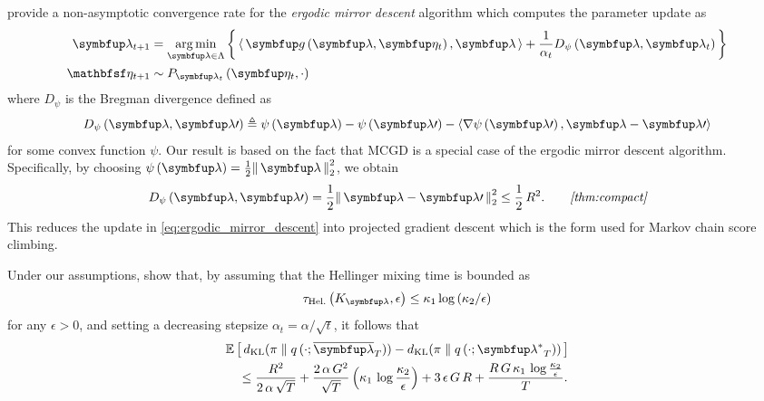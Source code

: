 \begin{proofEnd}
  \citet[Corollary 3.5]{duchi_ergodic_2012} provide a non-asymptotic convergence rate for the \textit{ergodic mirror descent} algorithm which computes the parameter update as
  \begin{align}
    \vlambda_{t+1} &= \argmin_{\vlambda \in \Lambda} \left\{\,
    \iprod{\,\vg\left(\vlambda, \veta_t\right)}{\vlambda\,} 
    +
    \frac{1}{\alpha_t} D_{\psi}\left(\vlambda, \vlambda_{t}\right)
    \,\right\}\label{eq:ergodic_mirror_descent}
    \\
    \rvveta_{t+1} &\sim P_{\vlambda_{t}}\left(\veta_t, \cdot\right)
    \nonumber
  \end{align}
  where \(D_{\psi}\) is the Bregman divergence defined as
  \begin{align*}
    D_{\psi}\left(\vlambda, \vlambda\prime\right)
    \triangleq
    \psi\left(\vlambda\right)
    - \psi\left(\vlambda\prime\right)
    - \iprod{ \nabla \psi\left(\vlambda\prime\right)}{\vlambda - \vlambda\prime}
  \end{align*}
  for some convex function \(\psi\).
  Our result is based on the fact that MCGD is a special case of the ergodic mirror descent algorithm.
  Specifically, by choosing \(\psi\left(\vlambda\right) = \frac{1}{2} \norm{\vlambda}^2_2 \), we obtain
  \begin{alignat}{2}
    D_{\psi}\left(\vlambda, \vlambda\prime\right) = \frac{1}{2} \norm{\vlambda - \vlambda\prime}_2^2 \leq \frac{1}{2} \, R^2.\label{eq:bregman}
    &&\quad\text{\textit{\cref{thm:compact}}}
  \end{alignat}
  This reduces the update in \cref{eq:ergodic_mirror_descent} into projected gradient descent which is the form used for Markov chain score climbing.

  Under our assumptions, \citet[Corollary 3.5]{duchi_ergodic_2012} show that, by assuming that the Hellinger mixing time is bounded as
  \begin{align}
    \tau_{\text{Hel.}}\left(K_{\vlambda}, \epsilon\right) \leq \kappa_1 \log\left( \kappa_2 /\epsilon \right) \label{eq:hellinger_mixing}
  \end{align}
  for any \(\epsilon > 0\), and setting a decreasing stepsize \(\alpha_t = \alpha / \sqrt{t}\),
  it follows that
  \begin{align}
    &\E{ \DKL{\pi}{q\,(\cdot; {\overline{\vlambda}_{T}})} - \DKL{\pi}{q\left(\cdot; {\vlambda^*}_{T}\right)}}
    \nonumber
    \\
    &\quad\leq
    \frac{R^2}{2 \, \alpha \, \sqrt{T}}
    +
    \frac{2 \, \alpha \, G^2}{\sqrt{T}}\left( \kappa_1 \, \log \frac{\kappa_2}{\epsilon} \right)
    +
    3 \, \epsilon \, G \, R
    +
    \frac{R \, G \, \kappa_1 \, \log \frac{\kappa_2}{\epsilon}}{T}.\label{eq:original_bound}
  \end{align}


\end{proofEnd}
